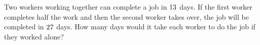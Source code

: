 
\MULTIPLY{}\m
\MULTIPLY\va\m\n

\question[4] Two workers working together can complete a job in $13$ days. If the first worker completes half the work and then the second worker takes over, the job will be completed in $27$ days. How many days would it take each worker to do the job if they worked alone?


\ifprintanswers
\fi 

